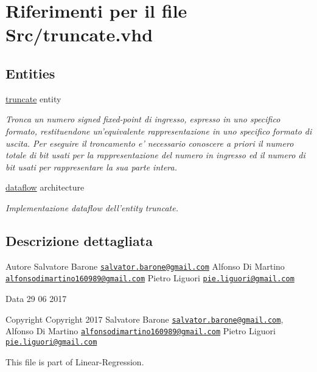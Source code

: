 \hypertarget{truncate_8vhd}{\section{Riferimenti per il file Src/truncate.vhd}
\label{truncate_8vhd}
}
\subsection*{Entities}
\begin{DoxyCompactItemize}
\item 
\hyperlink{classtruncate}{truncate} entity
\begin{DoxyCompactList}\small\item\em Tronca un numero signed fixed-\/point di ingresso, espresso in uno specifico formato, restituendone un'equivalente rappresentazione in uno specifico formato di uscita. Per eseguire il troncamento e' necessario conoscere a priori il numero totale di bit usati per la rappresentazione del numero in ingresso ed il numero di bit usati per rappresentare la sua parte intera. \end{DoxyCompactList}\item 
\hyperlink{classtruncate_1_1dataflow}{dataflow} architecture
\begin{DoxyCompactList}\small\item\em Implementazione dataflow dell'entity truncate. \end{DoxyCompactList}\end{DoxyCompactItemize}


\subsection{Descrizione dettagliata}
\begin{DoxyAuthor}{Autore}
Salvatore Barone \href{mailto:salvator.barone@gmail.com}{\tt salvator.\+barone@gmail.\+com} Alfonso Di Martino \href{mailto:alfonsodimartino160989@gmail.com}{\tt alfonsodimartino160989@gmail.\+com} Pietro Liguori \href{mailto:pie.liguori@gmail.com}{\tt pie.\+liguori@gmail.\+com}
\end{DoxyAuthor}
\begin{DoxyDate}{Data}
29 06 2017
\end{DoxyDate}
\begin{DoxyCopyright}{Copyright}
Copyright 2017 Salvatore Barone \href{mailto:salvator.barone@gmail.com}{\tt salvator.\+barone@gmail.\+com}, Alfonso Di Martino \href{mailto:alfonsodimartino160989@gmail.com}{\tt alfonsodimartino160989@gmail.\+com} Pietro Liguori \href{mailto:pie.liguori@gmail.com}{\tt pie.\+liguori@gmail.\+com}
\end{DoxyCopyright}
This file is part of Linear-\/\+Regression.

